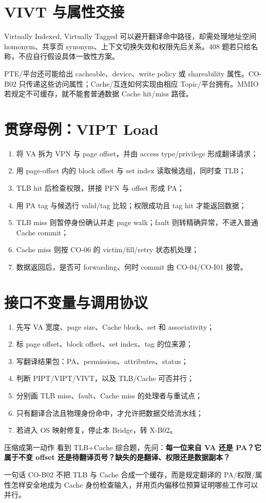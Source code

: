 \documentclass[UTF8,fontset=fandol,11pt,a4paper]{ctexart}
\newcommand{\kw}[1]{\textbf{\color{deep}#1}}
\begin{document}
\section{VIVT 与属性交接}
Virtually Indexed, Virtually Tagged 可以避开翻译命中路径，却需处理地址空间 homonym、共享页 synonym、上下文切换失效和权限先后关系。408 题若只给名称，不应自行假设具体一致性方案。

PTE/平台还可能给出 cacheable、device、write policy 或 shareability 属性。CO-B02 只传递这些访问属性；Cache/互连如何实现由相应 Topic/平台拥有。MMIO 若规定不可缓存，就不能套普通数据 Cache hit/miss 路径。

\section{贯穿母例：VIPT Load}
\begin{enumerate}
\item 将 VA 拆为 VPN 与 page offset，并由 access type/privilege 形成翻译请求；
\item 用 page-offset 内的 block offset 与 set index 读取候选组，同时查 TLB；
\item TLB hit 后检查权限，拼接 PFN 与 offset 形成 PA；
\item 用 PA tag 与候选行 valid/tag 比较；权限成功且 tag hit 才能返回数据；
\item TLB miss 则暂停身份确认并走 page walk；fault 则转精确异常，不进入普通 Cache commit；
\item Cache miss 则按 CO-06 的 victim/fill/retry 状态机处理；
\item 数据返回后，是否可 forwarding、何时 commit 由 CO-04/CO-I01 接管。
\end{enumerate}

\section{接口不变量与调用协议}
\begin{enumerate}
\item 先写 VA 宽度、page size、Cache block、set 和 associativity；
\item 标 page offset、block offset、set index、tag 的位来源；
\item 写翻译结果包：PA、permission、attributes、status；
\item 判断 PIPT/VIPT/VIVT，以及 TLB/Cache 可否并行；
\item 分别画 TLB miss、fault、Cache miss 的处理者与重试点；
\item 只有翻译合法且物理身份命中，才允许把数据交给流水线；
\item 若进入 OS 映射修复，停止本 Bridge，转 X-B02。
\end{enumerate}

\begin{methodbox}{压缩成第一动作}
看到 TLB+Cache 综合题，先问：\kw{每一位来自 VA 还是 PA？它属于不变 offset 还是待翻译页号？缺失的是翻译、权限还是数据副本？}
\end{methodbox}

\begin{corebox}{一句话}
CO-B02 不把 TLB 与 Cache 合成一个缓存，而是规定翻译的 PA/权限/属性怎样安全地成为 Cache 身份检查输入，并用页内偏移位预算证明哪些工作可以并行。
\end{corebox}
\end{document}
